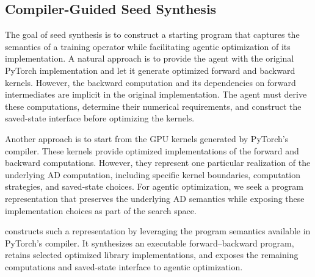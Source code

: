 \subsection{Compiler-Guided Seed Synthesis}
\label{sec:seed_synthesis}


The goal of seed synthesis is to construct a starting program that captures the semantics of a training operator while facilitating agentic optimization of its implementation. A natural approach is to provide the agent with the original PyTorch implementation and let it generate optimized forward and backward kernels. However, the backward computation and its dependencies on forward intermediates are implicit in the original implementation. The agent must derive these computations, determine their numerical requirements, and construct the saved-state interface before optimizing the kernels.

Another approach is to start from the GPU kernels generated by PyTorch's compiler. These kernels provide optimized implementations of the forward and backward computations. However, they represent one particular realization of the underlying AD computation, including specific kernel boundaries, computation strategies, and saved-state choices. For agentic optimization, we seek a program representation that preserves the underlying AD semantics while exposing these implementation choices as part of the search space.

\name constructs such a representation by leveraging the program semantics available in PyTorch's compiler. It synthesizes an executable forward--backward program, retains selected optimized library implementations, and exposes the remaining computations and saved-state interface to agentic optimization.

